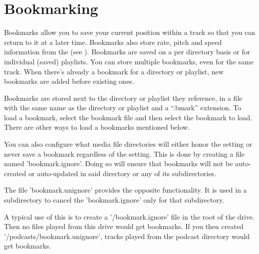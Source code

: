 \section{\label{ref:Bookmarkconfigactual}Bookmarking}
  Bookmarks allow you to save your current position within a track so that 
  you can return to it at a later time. Bookmarks also store rate, pitch
  and speed information from the  (see
  ). Bookmarks are saved on a per directory
  basis or for individual (saved) playlists. You can store multiple bookmarks,
  even for the same track. When there's already a bookmark for a directory or
  playlist, new bookmarks are added before existing ones.

  Bookmarks are stored next to the directory or playlist they reference, in a
  file with the same name as the directory or playlist and a ``.bmark''
  extension. To load a bookmark, select the bookmark file and then select
  the bookmark to load. There are other ways to load a bookmarks mentioned
  below.

  You can also configure what media file directories will either honor the
   setting or never save a bookmark regardless of
  the  setting. This is done by creating a file
  named 'bookmark.ignore'. Doing so will ensure that bookmarks will not be
  auto-created or auto-updated in said directory or any of its subdirectories.

  The file 'bookmark.unignore' provides the opposite functionality. It is used
  in a subdirectory to cancel the 'bookmark.ignore' only for that subdirectory.


  A typical use of this is to create a '/bookmark.ignore' file in the root of the drive.
  Then no files played from this drive would get bookmarks. If you then created
  '/podcasts/bookmark.unignore', tracks played from the podcast directory would get bookmarks.



